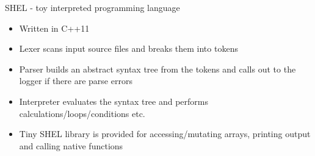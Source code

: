 \item SHEL - toy interpreted programming language
\begin{itemize}
    \item Written in C++11
    \item Lexer scans input source files and breaks them into tokens
    \item Parser builds an abstract syntax tree from the tokens and calls out to the logger if there are parse errors
    \item Interpreter evaluates the syntax tree and performs calculations/loops/conditions etc.
    \item Tiny SHEL library is provided for accessing/mutating arrays, printing output and calling native functions
\end{itemize}

